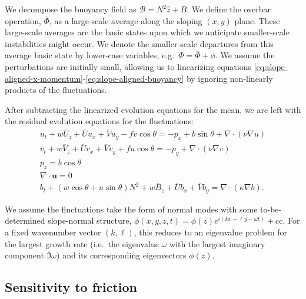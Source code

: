 \documentclass{article}
\begin{document}
We decompose the buoyancy field as $\mathcal{B} = N^{2}\hat{z} + B$. We define the overbar operation, $\overline{\Phi}$, as a large-scale average along the sloping $(x,y)$ plane. These large-scale averages are the basic states upon which we anticipate smaller-scale instabilities might occur. We denote the smaller-scale departures from this average basic state by lower-case variables, e.g.~$\Phi = \overline{\Phi} + \phi$. We assume the perturbations are initially small, allowing us to linearizing equations \ref{eq:slope-aligned-x-momentum}-\ref{eq:slope-aligned-buoyancy} by ignoring non-linearly products of the fluctuations.

After subtracting the linearized evolution equations for the mean, we are left with the residual evolution equations for the fluctuations:
\begin{gather}
u_{t} + w \overline{U}_{z} + \overline{U}u_{x} + \overline{V}u_{y} - f v\cos{\theta} = -p_{x} + b\sin{\theta} +  \nabla \cdot (\nu \nabla u) \\
v_{t} + w \overline{V}_{z} + \overline{U} v_{x} + \overline{V} v_{y} + fu\cos{\theta} = -p_{y} + \nabla \cdot (\nu \nabla v) \\
p_{z} = b \cos{\theta} \\
\nabla \cdot \mathbf{u} = 0 \\
b_{t} + (w\cos{\theta} + u\sin{\theta})N^{2} + w \overline{B}_{z} + \overline{U} b_{x} + \overline{V} b_{y} = \nabla \cdot \left( \kappa \nabla b \right).
\end{gather}

We assume the fluctuations take the form of normal modes with some to-be-determined slope-normal structure, $\phi(x,y,z,t) = \phi(z) e^{i(kx+\ell y-\omega t)} + \text{cc}$. For a fixed wavenumber vector $(k,\ell)$, this reduces to an eigenvalue problem for the largest growth rate (i.e.~the eigenvalue $\omega$ with the largest imaginary component $\Im{\omega}$) and its corresponding eigenvectors $\phi(z)$.


\subsection{Sensitivity to friction}



\newpage



\end{document}
